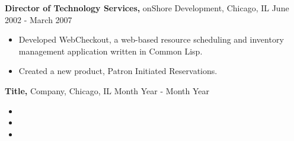 \documentclass[margin]{res}
\begin{document}
\begin{resume}
 {\bf Director of Technology Services,} onShore Development, Chicago, IL \hfill June 2002 - March 2007
\begin{itemize} \itemsep -2pt %
\item Developed WebCheckout, a web-based resource scheduling and inventory management application written in Common Lisp.  
\item Created a new product, Patron Initiated Reservations.
\end{itemize}

 {\bf Title,} Company, Chicago, IL \hfill Month Year - Month Year
\begin{itemize} \itemsep -2pt %
\item 
\item 
\item 
\end{itemize}


\end{resume} 
\end{document}
